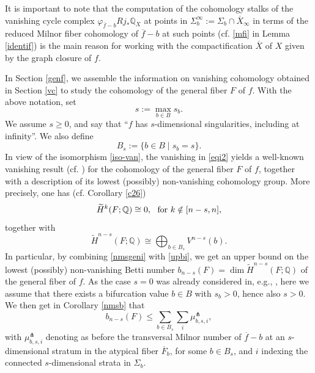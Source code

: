 \documentclass[12pt,leqno,twoside]{amsart}
\theoremstyle{remark}
\theoremstyle{remark}
\theoremstyle{definition}
\theoremstyle{remark}
\theoremstyle{remark}
\theoremstyle{remark}
\numberwithin{equation}{section}  %
\def\be{\begin{equation}}
\def\ee{\end{equation}}
\newcommand{\bQ}{\mathbb{Q}}
\newcommand{\of}{\overline{f}}
\newcommand{\oX}{\overline{X}}
\newcommand{\oF}{\overline{F}}
\newcommand{\wti}{\widetilde}
\begin{document}
It is important to note that the computation of the cohomology stalks of the vanishing cycle complex $\varphi_{\of-b}Rj_*\bQ_X$ at points in $\Sigma_b^\infty:=\Sigma_b \cap \oX_\infty$ in terms of the reduced Milnor fiber cohomology of $\of -b$ at such points (cf. \eqref{mfi} in Lemma \ref{identif}) is the main reason for working with the compactification $\oX$ of $X$ given by the graph closure of $f$.

 \medskip
 
 In Section \ref{genf}, we assemble the information on vanishing cohomology obtained in Section \ref{vc} to study the cohomology of the general fiber $F$ of $f$. With the above notation, set \[ s:=\max_{b\in B} s_b.\] We assume $s \geq 0$, and say that ``$f$ has $s$-dimensional singularities, including at infinity''.  We also define
\[B_s:=\{b \in B \mid s_b=s\}.\]
In view of the isomorphism \eqref{iso-van}, the vanishing in \eqref{eqi2} yields a well-known vanishing result (cf. \cite{NN,ST,Bre,Di}) for the cohomology of the general fiber $F$ of $f$, together with a description of its lowest (possibly) non-vanishing cohomology group. More precisely, one has (cf. Corollary \ref{c26})
\be\label{eqi3} \widetilde{H}^k(F;\bQ)\cong 0,  \ \ {\rm for} \ k \notin [n-s,n], \ee together with
\be\label{nmsgeni}
\widetilde{H}^{n-s}(F;\bQ)\cong \bigoplus_{b \in B_s} V^{n-s}(b).
\ee
In particular, by combining \eqref{nmsgeni} with \eqref{upbi}, we get an upper bound on the lowest (possibly) non-vanishing Betti number $b_{n-s}(F)=\dim \wti{H}^{n-s}(F;\bQ)$ of the general fiber of $f$. 
As the case $s=0$ was already considered in, e.g., \cite{ST,Hamm,Di}, here we assume that there exists a bifurcation value $b \in B$ with $s_b>0$, hence also $s>0$. We then get in Corollary \ref{nmsb} that
 \be\label{nmsgbi}
b_{n-s}(F) \leq  \sum_{b \in B_s} \sum_i  \mu^\pitchfork_{b,s,i},
 \ee
with $\mu^\pitchfork_{b,s,i}$ denoting as before the transversal Milnor  number of $\of-b$ at an $s$-dimensional stratum in the atypical fiber $\oF_b$, for some $b \in B_s$, and $i$ indexing the connected $s$-dimensional strata in $\Sigma_b$.



\end{document}
